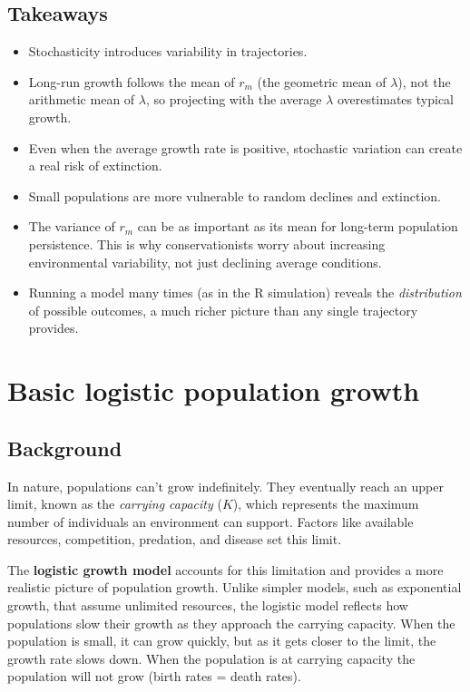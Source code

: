 \documentclass[
  a4paper]{book}
\providecommand{\tightlist}{%
  \setlength{\itemsep}{0pt}\setlength{\parskip}{0pt}}
\begin{document}
\section{Takeaways}\label{takeaways-4}

\begin{itemize}
\tightlist
\item
  Stochasticity introduces variability in trajectories.
\item
  Long-run growth follows the mean of \(r_m\) (the geometric mean of \(\lambda\)), not the arithmetic mean of \(\lambda\), so projecting with the average \(\lambda\) overestimates typical growth.
\item
  Even when the average growth rate is positive, stochastic variation can create a real risk of extinction.
\item
  Small populations are more vulnerable to random declines and extinction.
\item
  The variance of \(r_m\) can be as important as its mean for long-term population persistence. This is why conservationists worry about increasing environmental variability, not just declining average conditions.
\item
  Running a model many times (as in the R simulation) reveals the \emph{distribution} of possible outcomes, a much richer picture than any single trajectory provides.
\end{itemize}

\chapter{Basic logistic population growth}\label{basic-logistic-population-growth}

\section{Background}\label{background-5}

In nature, populations can't grow indefinitely. They eventually reach an upper limit, known as the \emph{carrying capacity} (\(K\)), which represents the maximum number of individuals an environment can support. Factors like available resources, competition, predation, and disease set this limit.

The \textbf{logistic growth model} accounts for this limitation and provides a more realistic picture of population growth. Unlike simpler models, such as exponential growth, that assume unlimited resources, the logistic model reflects how populations slow their growth as they approach the carrying capacity. When the population is small, it can grow quickly, but as it gets closer to the limit, the growth rate slows down. When the population is at carrying capacity the population will not grow (birth rates = death rates).
\end{document}
